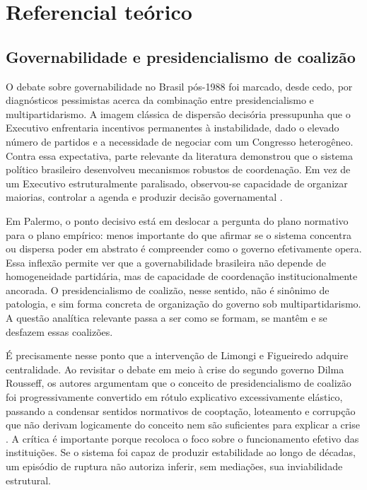 \documentclass[12pt,a4paper]{article}
\begin{document}
\section{Referencial teórico}
\label{sec:org3fc0d40}
\subsection{Governabilidade e presidencialismo de coalizão}
\label{sec:org61be9e6}
O debate sobre governabilidade no Brasil pós-1988 foi marcado, desde cedo, por diagnósticos pessimistas acerca da combinação entre presidencialismo e multipartidarismo. A imagem clássica de dispersão decisória pressupunha que o Executivo enfrentaria incentivos permanentes à instabilidade, dado o elevado número de partidos e a necessidade de negociar com um Congresso heterogêneo. Contra essa expectativa, parte relevante da literatura demonstrou que o sistema político brasileiro desenvolveu mecanismos robustos de coordenação. Em vez de um Executivo estruturalmente paralisado, observou-se capacidade de organizar maiorias, controlar a agenda e produzir decisão governamental \textcite{palermo2000_como_se}.

Em Palermo, o ponto decisivo está em deslocar a pergunta do plano normativo para o plano empírico: menos importante do que afirmar se o sistema concentra ou dispersa poder em abstrato é compreender como o governo efetivamente opera. Essa inflexão permite ver que a governabilidade brasileira não depende de homogeneidade partidária, mas de capacidade de coordenação institucionalmente ancorada. O presidencialismo de coalizão, nesse sentido, não é sinônimo de patologia, e sim forma concreta de organização do governo sob multipartidarismo. A questão analítica relevante passa a ser como se formam, se mantêm e se desfazem essas coalizões.

É precisamente nesse ponto que a intervenção de Limongi e Figueiredo adquire centralidade. Ao revisitar o debate em meio à crise do segundo governo Dilma Rousseff, os autores argumentam que o conceito de presidencialismo de coalizão foi progressivamente convertido em rótulo explicativo excessivamente elástico, passando a condensar sentidos normativos de cooptação, loteamento e corrupção que não derivam logicamente do conceito nem são suficientes para explicar a crise \textcite{limongi2017_a_crise}. A crítica é importante porque recoloca o foco sobre o funcionamento efetivo das instituições. Se o sistema foi capaz de produzir estabilidade ao longo de décadas, um episódio de ruptura não autoriza inferir, sem mediações, sua inviabilidade estrutural.
\end{document}
